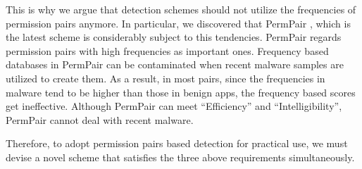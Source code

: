 \documentclass{ieeeaccess}
\begin{document}
This is why we argue that detection schemes should not utilize the frequencies of permission pairs anymore.  
In particular, we discovered that PermPair \cite{arora2019permpair}, which is the latest scheme is considerably subject to this tendencies.
PermPair regards permission pairs with high frequencies as important ones.
Frequency based databases in PermPair can be contaminated when recent malware samples are utilized to create them.
As a result, in most pairs, since the frequencies in malware tend to be higher than those in benign apps, the frequency based scores get ineffective.
Although PermPair can meet ``Efficiency'' and ``Intelligibility'', PermPair cannot deal with recent malware.

Therefore, to adopt permission pairs based detection for practical use, we must devise a novel scheme that satisfies the three above requirements simultaneously.
\end{document}
